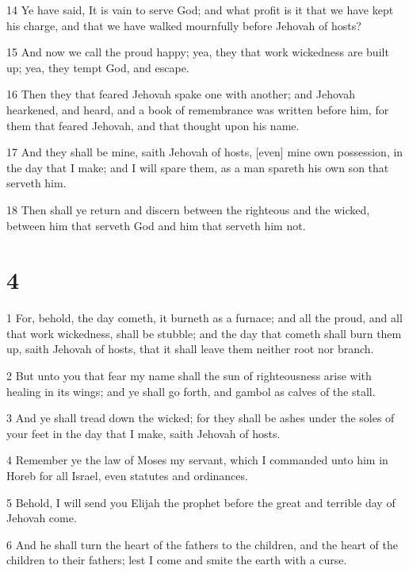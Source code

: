 \par 14 Ye have said, It is vain to serve God; and what profit is it that we have kept his charge, and that we have walked mournfully before Jehovah of hosts?
\par 15 And now we call the proud happy; yea, they that work wickedness are built up; yea, they tempt God, and escape.
\par 16 Then they that feared Jehovah spake one with another; and Jehovah hearkened, and heard, and a book of remembrance was written before him, for them that feared Jehovah, and that thought upon his name.
\par 17 And they shall be mine, saith Jehovah of hosts, [even] mine own possession, in the day that I make; and I will spare them, as a man spareth his own son that serveth him.
\par 18 Then shall ye return and discern between the righteous and the wicked, between him that serveth God and him that serveth him not.

\chapter{4}

\par 1 For, behold, the day cometh, it burneth as a furnace; and all the proud, and all that work wickedness, shall be stubble; and the day that cometh shall burn them up, saith Jehovah of hosts, that it shall leave them neither root nor branch.
\par 2 But unto you that fear my name shall the sun of righteousness arise with healing in its wings; and ye shall go forth, and gambol as calves of the stall.
\par 3 And ye shall tread down the wicked; for they shall be ashes under the soles of your feet in the day that I make, saith Jehovah of hosts.
\par 4 Remember ye the law of Moses my servant, which I commanded unto him in Horeb for all Israel, even statutes and ordinances.
\par 5 Behold, I will send you Elijah the prophet before the great and terrible day of Jehovah come.
\par 6 And he shall turn the heart of the fathers to the children, and the heart of the children to their fathers; lest I come and smite the earth with a curse.

